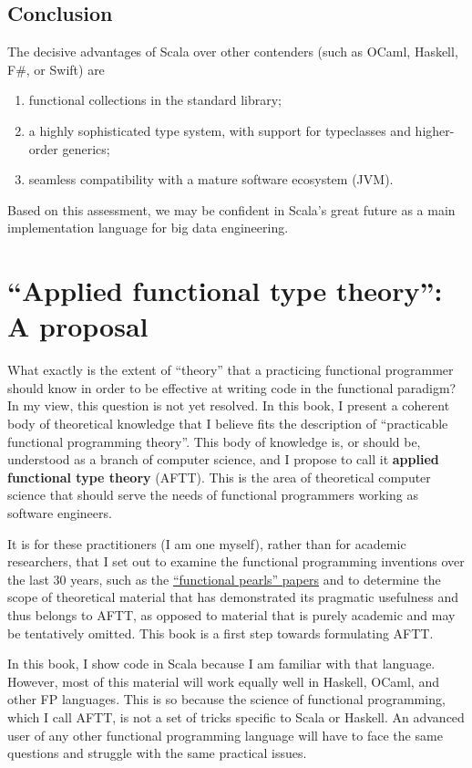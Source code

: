 \section{Conclusion}

The decisive advantages of Scala over other contenders (such as OCaml,
Haskell, F\#, or Swift) are
\begin{enumerate}
\item functional collections in the standard library;
\item a highly sophisticated type system, with support for typeclasses and
higher-order generics; 
\item seamless compatibility with a mature software ecosystem (JVM). 
\end{enumerate}
Based on this assessment, we may be confident in Scala's great future
as a main implementation language for big data engineering. 

\chapter{``Applied functional type theory'': A proposal}

What exactly is the extent of ``theory'' that a practicing functional
programmer should know in order to be effective at writing code in
the functional paradigm? In my view, this question is not yet resolved.
In this book, I present a coherent body of theoretical knowledge that
I believe fits the description of ``practicable functional programming
theory''. This body of knowledge is, or should be, understood as
a branch of computer science, and I propose to call it\textbf{ applied
functional type theory} (AFTT). This is the area of theoretical computer
science that should serve the needs of functional programmers working
as software engineers.

It is for these practitioners (I am one myself), rather than for academic
researchers, that I set out to examine the functional programming
inventions over the last 30 years, \textendash{} such as the \href{https://wiki.haskell.org/Research_papers/Functional_pearls}{\textquotedblleft functional pearls\textquotedblright{} papers}
\textendash{} and to determine the scope of theoretical material that
has demonstrated its pragmatic usefulness and thus belongs to AFTT,
as opposed to material that is purely academic and may be tentatively
omitted. This book is a first step towards formulating AFTT.

In this book, I show code in Scala because I am familiar with that
language. However, most of this material will work equally well in
Haskell, OCaml, and other FP languages. This is so because the science
of functional programming, which I call AFTT, is not a set of tricks
specific to Scala or Haskell. An advanced user of any other functional
programming language will have to face the same questions and struggle
with the same practical issues.

